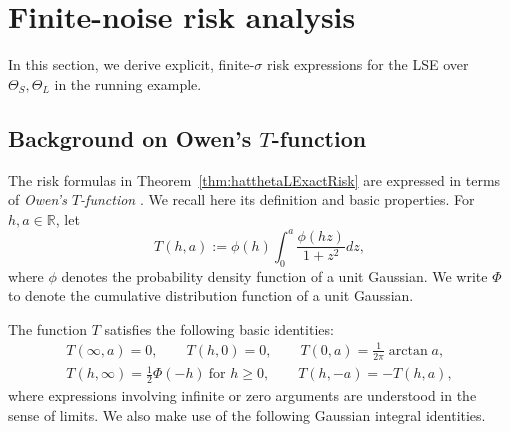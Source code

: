 \documentclass[11pt]{article}
\theoremstyle{plain}
\theoremstyle{definition}
\providecommand{\mathbbm}{\mathbb} %
\newcommand{\R}{\mathbbm{R}}
\begin{document}
\section{Finite-noise risk analysis}\label{sec:auxresults}

In this section, we derive explicit, finite-$\sigma$ risk expressions for the LSE over $\Theta_S, \Theta_L$ in the running example.


\subsection{Background on Owen's \texorpdfstring{$T$}{T}-function}
The risk formulas in Theorem~\ref{thm:hatthetaLExactRisk} are expressed in terms of \emph{Owen's $T$-function} \cite{owen1980table}. We recall here its definition and basic properties. For $h,a\in\R$, let
\[
T(h,a)
:=
\phi(h)\int_0^a \frac{\phi(hz)}{1+z^2}dz,
\]
where $\phi$ denotes the probability density function of a unit Gaussian. We write $\Phi$ to denote the cumulative distribution function of a unit Gaussian. 

The function $T$ satisfies the following basic identities:
\[
\begin{gathered}
    T(\infty,a)=0,\qquad
    T(h,0)=0,\qquad
    T(0,a)=\frac{1}{2\pi}\arctan a, \\
    T(h,\infty)=\frac12\Phi(-h)\ \text{for }h\ge0, \qquad
    T(h,-a)=-T(h,a),
\end{gathered}
\]
where expressions involving infinite or zero arguments are understood in the sense of limits.
We also make use of the following Gaussian integral identities.
\end{document}
